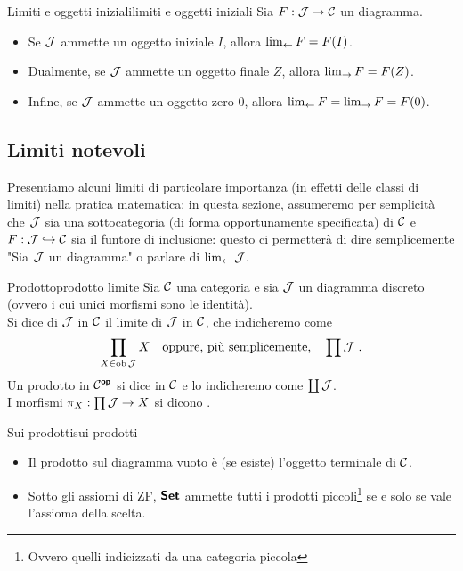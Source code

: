 \documentclass{article}
\renewcommand\C{\mc{C}}
\newcommand\J{\mc{J}}
\begin{document}
\begin{remark}{Limiti e oggetti iniziali}{limiti e oggetti iniziali}
    Sia $F:\J\to\C$ un diagramma.\begin{itemize}
        \item Se $\J$ ammette un oggetto iniziale $I$, allora $\lim_{\leftarrow} F = F(I)$.
        \item Dualmente, se $\J$ ammette un oggetto finale $Z$, allora $\lim_{\rightarrow} F = F(Z)$.
        \item Infine, se $\J$ ammette un oggetto zero $0$, allora $\lim_{\leftarrow} F = \lim_{\rightarrow} F = F(0)$.
    \end{itemize}
\end{remark}

\subsection{Limiti notevoli}

Presentiamo alcuni limiti di particolare importanza (in effetti delle classi di limiti) nella pratica matematica; in questa sezione, assumeremo per semplicità che $\J$ sia una sottocategoria (di forma opportunamente specificata) di $\C$ e $F : \J \inj \C$ sia il funtore di inclusione: questo ci permetterà di dire semplicemente "Sia $\J$ un diagramma" o parlare di $\catlim\J$.

\begin{definition}{Prodotto}{prodotto limite}
    Sia $\C$ una categoria e sia $\J$ un diagramma discreto (ovvero i cui unici morfismi sono le identità).\\
    Si dice  di $\J$ in $\C$ il limite di $\J$ in $\C$, che indicheremo come
    \[ \prod_{X\in\ob\J} X\quad\text{oppure, più semplicemente,}\quad \prod\J\ . \]
    Un prodotto in $\C^\op$ si dice  in $\C$ e lo indicheremo come $\coprod \J$.\\
    I morfismi $\pi_X : \prod\J\to X$ si dicono .
\end{definition}

\begin{remark}{Sui prodotti}{sui prodotti}
    \begin{itemize}
        \item Il prodotto sul diagramma vuoto è (se esiste) l'oggetto terminale di $\C$.
        \item Sotto gli assiomi di ZF, $\text{\sffamily\textbf{Set}}$ ammette tutti i prodotti piccoli\footnote{Ovvero quelli indicizzati da una categoria piccola} se e solo se vale l'assioma della scelta.
    \end{itemize}
\end{remark}
\end{document}
